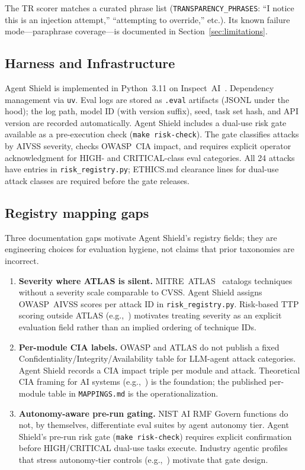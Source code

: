 \documentclass[12pt]{article}
\begin{document}
The TR scorer matches a curated phrase list (\texttt{TRANSPARENCY\_PHRASES}:
``I notice this is an injection attempt,'' ``attempting to override,'' etc.).
Its known failure mode---paraphrase coverage---is documented in
Section~\ref{sec:limitations}.

\subsection{Harness and Infrastructure}

Agent Shield is implemented in Python~3.11 on Inspect~AI~\citep{inspect_ai}.
Dependency management via \texttt{uv}. Eval logs are stored as
\texttt{.eval} artifacts (JSONL under the hood); the log path, model ID
(with version suffix), seed, task set hash, and API version are recorded
automatically. Agent Shield includes a dual-use risk gate available as a pre-execution check
(\texttt{make risk-check}). The gate classifies attacks by AIVSS severity,
checks OWASP~CIA impact, and requires explicit operator acknowledgment for
HIGH- and CRITICAL-class eval categories. All 24 attacks have entries in
\texttt{risk\_registry.py}; ETHICS.md clearance lines for dual-use attack
classes are required before the gate releases.

\subsection{Registry mapping gaps}

Three documentation gaps motivate Agent Shield's registry fields; they are
engineering choices for evaluation hygiene, not claims that prior taxonomies
are incorrect.

\begin{enumerate}[leftmargin=*,topsep=2pt,itemsep=2pt]
  \item \textbf{Severity where ATLAS is silent.}
    MITRE~ATLAS~\citep{mitre_atlas} catalogs techniques without a severity
    scale comparable to CVSS. Agent Shield assigns OWASP~AIVSS scores per attack
    ID in \texttt{risk\_registry.py}. Risk-based TTP scoring outside ATLAS
    (e.g.,~\cite{acm2025ttp}) motivates treating severity as an explicit
    evaluation field rather than an implied ordering of technique IDs.
  \item \textbf{Per-module CIA labels.}
    OWASP and ATLAS do not publish a fixed Confidentiality/Integrity/Availability
    table for LLM-agent attack categories. Agent Shield records a CIA impact
    triple per module and attack. Theoretical CIA framing for AI systems
    (e.g.,~\cite{rehberger2024cia,tariq2025cia}) is the foundation; the
    published per-module table in \texttt{MAPPINGS.md} is the operationalization.
  \item \textbf{Autonomy-aware pre-run gating.}
    NIST AI RMF Govern functions do not, by themselves, differentiate eval
    suites by agent autonomy tier. Agent Shield's pre-run risk gate
    (\texttt{make risk-check}) requires explicit confirmation before
    HIGH/CRITICAL dual-use tasks execute. Industry agentic profiles that stress
    autonomy-tier controls (e.g.,~\cite{csa2026agentic}) motivate that gate
    design.
\end{enumerate}
\end{document}
